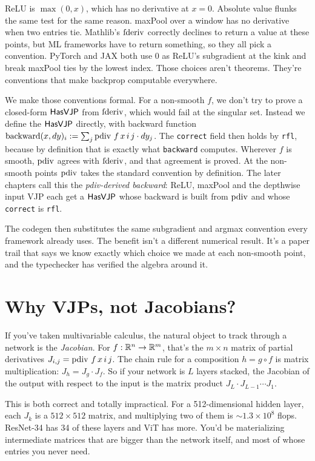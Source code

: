 ReLU is $\max(0, x)$, which has no derivative at $x=0$. Absolute value
flunks the same test for the same reason. maxPool over a window
has no derivative when two entries tie. Mathlib's \(\operatorname{fderiv}\)
correctly declines to return a value at these points, but ML
frameworks have to return something, so they all pick a
convention. PyTorch and JAX both use $0$ as ReLU's subgradient at
the kink and break maxPool ties by the lowest index.
Those choices aren't theorems. They're conventions that make
backprop computable everywhere.

We make those conventions formal. For a non-smooth $f$, we don't
try to prove a closed-form \(\mathsf{HasVJP}\) from \(\operatorname{fderiv}\), which would
fail at the singular set. Instead we define the \(\mathsf{HasVJP}\) directly,
with backward function
$\mathrm{backward}(x, dy)_i := \sum_j \operatorname{pdiv}\, f\, x\, i\, j \cdot dy_j$.
The \texttt{correct} field then holds by \texttt{rfl}, because by
definition that is exactly what \texttt{backward} computes. Wherever
$f$ is smooth, \(\operatorname{pdiv}\) agrees with \(\operatorname{fderiv}\), and that agreement is
proved. At the non-smooth points \(\operatorname{pdiv}\) takes the standard convention
by definition. The later chapters call this the \emph{pdiv-derived
backward}: ReLU, maxPool and the depthwise input VJP each get a
\(\mathsf{HasVJP}\) whose backward is built from \(\operatorname{pdiv}\) and whose
\texttt{correct} is \texttt{rfl}.

The codegen then substitutes the same subgradient and argmax convention
every framework already uses. The benefit isn't a different numerical
result. It's a paper trail that says we know exactly which choice we made
at each non-smooth point, and the typechecker has verified the algebra
around it.

\section*{Why VJPs, not Jacobians?}

If you've taken multivariable calculus, the natural object to track
through a network is the \emph{Jacobian}. For
$f : \mathbb{R}^{n} \to \mathbb{R}^{m}$, that's the $m \times n$ matrix of
partial derivatives $J_{i,j} = \operatorname{pdiv}\, f\, x\, i\, j$. The chain rule
for a composition $h = g \circ f$ is matrix multiplication:
$J_h = J_g \cdot J_f$. So if your network is $L$ layers stacked, the
Jacobian of the output with respect to the input is the matrix
product $J_L \cdot J_{L-1} \cdots J_1$.

This is both correct and totally impractical. For a 512-dimensional hidden
layer, each $J_k$ is a $512 \times 512$ matrix, and multiplying two of
them is $\sim 1.3 \times 10^8$ flops. ResNet-34 has 34 of these
layers and ViT has more. You'd be materializing intermediate matrices
that are bigger than the network itself, and most of whose entries
you never need.

